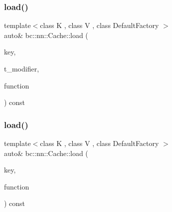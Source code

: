 \subsubsection{\texorpdfstring{load()}{load()}\hspace{0.1cm}{\footnotesize\ttfamily [6/8]}}
{\footnotesize\ttfamily template$<$class K , class V , class Default\+Factory $>$ \\
auto\& bc\+::nn\+::\+Cache\+::load (\begin{DoxyParamCaption}\item[{\hyperlink{structbc_1_1nn_1_1Cache_aedd77c5710dcb5f9edd8ecb3c3041048}{key\+\_\+type}$<$ K, V, cache\+\_\+key\+\_\+type\+::always\+\_\+recurrent $>$}]{key,  }\item[{int}]{t\+\_\+modifier,  }\item[{Default\+Factory}]{function }\end{DoxyParamCaption}) const\hspace{0.3cm}{\ttfamily [inline]}}

\mbox{\label{structbc_1_1nn_1_1Cache_a8cddd3d99d6e5b2a8999aed78159e83e}} 
\subsubsection{\texorpdfstring{load()}{load()}\hspace{0.1cm}{\footnotesize\ttfamily [7/8]}}
{\footnotesize\ttfamily template$<$class K , class V , class Default\+Factory $>$ \\
auto\& bc\+::nn\+::\+Cache\+::load (\begin{DoxyParamCaption}\item[{\hyperlink{structbc_1_1nn_1_1Cache_aedd77c5710dcb5f9edd8ecb3c3041048}{key\+\_\+type}$<$ K, V, cache\+\_\+key\+\_\+type\+::always\+\_\+recurrent $>$}]{key,  }\item[{Default\+Factory}]{function }\end{DoxyParamCaption}) const\hspace{0.3cm}{\ttfamily [inline]}}

\mbox{\label{structbc_1_1nn_1_1Cache_a62ccfaf7cce58a593c3793b187380a46}} 
